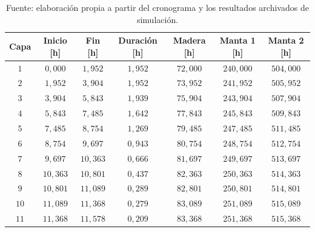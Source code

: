 \begin{table}[H]
  \centering
  \caption{Cronograma por capa del plan de $55\,\mathrm{m^3/h}$}
  \label{tab:cronograma-55}
  \small
  \setlength{\tabcolsep}{4pt}
  \begin{tabular}{ccccccc}
    \toprule
    Capa & Inicio [h] & Fin [h] & Duración [h] & Madera [h] & Manta 1 [h] & Manta 2 [h] \\
    \midrule
    $1$ & $0{,}000$ & $1{,}952$ & $1{,}952$ & $72{,}000$ & $240{,}000$ & $504{,}000$ \\
    $2$ & $1{,}952$ & $3{,}904$ & $1{,}952$ & $73{,}952$ & $241{,}952$ & $505{,}952$ \\
    $3$ & $3{,}904$ & $5{,}843$ & $1{,}939$ & $75{,}904$ & $243{,}904$ & $507{,}904$ \\
    $4$ & $5{,}843$ & $7{,}485$ & $1{,}642$ & $77{,}843$ & $245{,}843$ & $509{,}843$ \\
    $5$ & $7{,}485$ & $8{,}754$ & $1{,}269$ & $79{,}485$ & $247{,}485$ & $511{,}485$ \\
    $6$ & $8{,}754$ & $9{,}697$ & $0{,}943$ & $80{,}754$ & $248{,}754$ & $512{,}754$ \\
    $7$ & $9{,}697$ & $10{,}363$ & $0{,}666$ & $81{,}697$ & $249{,}697$ & $513{,}697$ \\
    $8$ & $10{,}363$ & $10{,}801$ & $0{,}437$ & $82{,}363$ & $250{,}363$ & $514{,}363$ \\
    $9$ & $10{,}801$ & $11{,}089$ & $0{,}289$ & $82{,}801$ & $250{,}801$ & $514{,}801$ \\
    $10$ & $11{,}089$ & $11{,}368$ & $0{,}279$ & $83{,}089$ & $251{,}089$ & $515{,}089$ \\
    $11$ & $11{,}368$ & $11{,}578$ & $0{,}209$ & $83{,}368$ & $251{,}368$ & $515{,}368$ \\
    \bottomrule
  \end{tabular}
  \captionsetup{skip=2pt}
  \caption*{Fuente: elaboración propia a partir del cronograma y los resultados archivados de simulación.}
\end{table}
